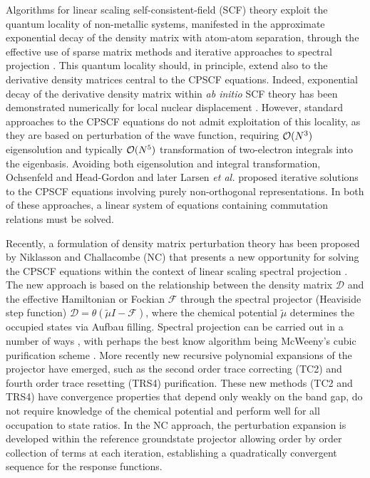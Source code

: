 \documentclass[prl,aps,preprint,showpacs,superbib]{revtex4}
\begin{document}
Algorithms for linear scaling self-consistent-field (SCF) theory exploit the quantum locality
of non-metallic systems, manifested in the approximate exponential decay of the density matrix 
with atom-atom separation, through the effective use of sparse matrix methods and iterative 
approaches to spectral projection \cite{ANiklasson02A,ANiklasson03}.   This quantum locality should, 
in principle, extend also to the derivative density matrices central to the CPSCF equations.  Indeed,  
exponential decay of the derivative density matrix within {\em ab initio} SCF theory has been demonstrated 
numerically for local nuclear displacement \cite{Ochsenfeld_1997}. However, standard approaches to the CPSCF equations 
\cite{Pople_1979,Sekino_1986,Dupuis_1991} do not admit exploitation of this locality, as they are based 
on perturbation of the wave function, requiring ${\cal O}(N^3)$ eigensolution and typically ${\cal O}(N^5)$ 
transformation of two-electron integrals into the eigenbasis.   Avoiding both 
eigensolution and integral transformation,  Ochsenfeld and Head-Gordon \cite{Ochsenfeld_1997} and
later Larsen {\em et al.} \cite{Helgaker_2001} proposed iterative solutions to the CPSCF equations 
involving purely non-orthogonal representations.   In both of these approaches, a 
linear system of equations containing commutation relations must be solved.

Recently, a formulation of density matrix perturbation theory has been proposed 
by Niklasson and Challacombe (NC) \cite{ANiklasson04} that presents a new opportunity for solving 
the CPSCF equations within the context of linear scaling spectral projection \cite{ANiklasson02A,ANiklasson03}.  
The new approach is based on the relationship between the density matrix $\mathcal{D}$ and the effective Hamiltonian 
or Fockian $\mathcal{F}$ through the spectral projector (Heaviside step function) $\mathcal{D}=\theta(\tilde{\mu}I-\mathcal{F})$, 
where the chemical potential $\tilde{\mu}$ determines the occupied states via Aufbau filling.   
Spectral projection can be carried out in a number of ways 
\cite{ANiklasson02A,ANiklasson03,RMcWeeny60,WClinton69,APalser98,GBeylkin99,KNemeth00,AHolas01}, 
with perhaps the best know algorithm being McWeeny's cubic purification scheme \cite{RMcWeeny60}. 
More recently new recursive polynomial expansions of the projector have emerged, 
such as the second order trace correcting (TC2) \cite{ANiklasson02A} and fourth order trace resetting 
(TRS4) \cite{ANiklasson03} purification.  These new methods (TC2 and TRS4) have convergence properties 
that depend only weakly on the band gap, do not require knowledge of the chemical potential
and perform well for all occupation to state ratios. In the NC approach, 
the perturbation expansion is developed within the reference groundstate projector allowing 
order by order collection of terms at each iteration, establishing a quadratically convergent 
sequence for the response functions.  
\end{document}
